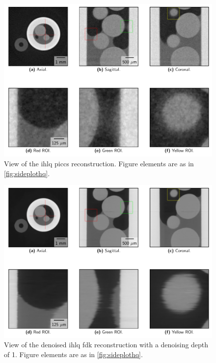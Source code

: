 \begin{figure}[htbp]
  \centering
  \includegraphics[width=.9\textwidth]{figures/kimrobertpiccs-x475y620s250.pdf}
  \caption[View of IHLQ PICCS]{View of the \gls{ihlq} \gls{piccs} reconstruction. Figure elements are as in \cref{fig:sideplothq}. }
  \label{fig:sideplotpiccs}
\end{figure}

\begin{figure}[htbp]
  \centering
  \includegraphics[width=.9\textwidth]{figures/kimrobertdepth1-x475y620s250.pdf}
  \caption[View of IHLQ FDK denoised with a depth of 1]{View of the denoised \gls{ihlq} \gls{fdk} reconstruction with a denoising depth of 1. Figure elements are as in \cref{fig:sideplothq}. }
  \label{fig:sideplotdepth1}
\end{figure}

